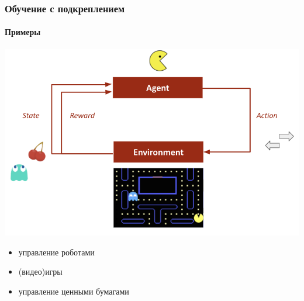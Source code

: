 \documentclass[fullscreen=true, bookmarks=true, hyperref={pdfencoding=unicode}]{beamer}
\begin{document}
\begin{frame}
  \frametitle{Обучение с подкреплением}
  \framesubtitle{Примеры}

  \begin{center}
    \includegraphics[keepaspectratio,
                     width=.7\paperwidth]{rl_scheme.png}
  \end{center}

  \begin{itemize}
    \item управление роботами
    \item (видео)игры
    \item управление ценными бумагами
  \end{itemize}
\end{frame}
\end{document}
